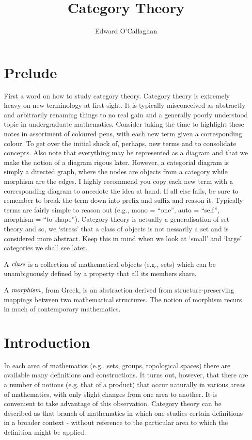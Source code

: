 \documentclass[10pt, oneside, reqno]{amsart}
\title{Category Theory}                           %
\author{Edward O'Callaghan}
\date{}                                           %
\begin{document}
\maketitle \tableofcontents \clearpage

\section{Prelude} %
\label{sec:purelude}
First a word on how to study category theory. Category theory is extremely heavy on new terminology at first sight.
It is typically misconceived as abstractly and arbitrarily renaming things to no real gain and a generally poorly understood
topic in undergraduate mathematics. Consider taking the time to highlight these notes in assortment of coloured pens,
with each new term given a corresponding colour. To get over the initial shock of, perhaps, new terms and to consolidate concepts.
Also note that everything may be represented as a diagram and that we make the notion of a diagram rigous later. However,
a categorial diagram is simply a directed graph, where the nodes are objects from a category while morphism are the edges.
I highly recommend you copy each new term with a corresponding diagram to anecdote the idea at hand.
If all else fails, be sure to remember to break the term down into prefix and suffix and reason it.
Typically terms are fairly simple to reason out (e.g., mono = ``one'', auto = ``self'', morphism = ``to shape'').
Category theory is actually a generalisation of set theory and so, we `stress' that a class of objects is not
nessarily a set and is considered more abstract. Keep this in mind when we look at `small' and `large' categories
we shall see later.

\begin{note}[Class]
 A $\emph{class}$ is a collection of mathematical objects (e.g., sets)
 which can be unambiguously defined by a property that all its members share.
\end{note}

\begin{note}[Morphism]
 A $\emph{morphism}$, from Greek, is an abstraction derived from
 structure-preserving mappings between two mathematical structures.
 The notion of morphism recurs in much of contemporary mathematics.
\end{note}

\section{Introduction} %
\label{sec:introduction}
In each area of mathematics (e.g., sets, groups, topological spaces) there are available many definitions
and constructions. It turns out, however, that there are a number of notions (e.g. that of a product)
that occur naturally in various areas of mathematics, with only slight changes from one area to another.
It is convenient to take advantage of this observation. Category theory can be described as that branch of mathematics
in which one studies certain definitions in a broader context - without reference to the particular area to which
the definition might be applied.
\end{document}
